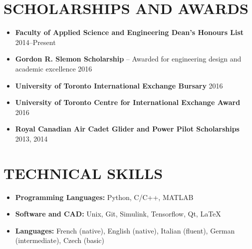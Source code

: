 \documentclass{ResumeTemplate}
\begin{document}
	\section{SCHOLARSHIPS AND AWARDS}	
	\begin{itemize}[noitemsep, leftmargin=*]
		\item \textbf{Faculty of Applied Science and Engineering Dean's Honours List} \hfill 2014--Present
		\item \textbf{Gordon R. Slemon Scholarship} -- Awarded for engineering design and academic excellence \hfill 2016
		\item \textbf{University of Toronto International Exchange Bursary} \hfill 2016
		\item \textbf{University of Toronto Centre for International Exchange Award} \hfill 2016
		\item \textbf{Royal Canadian Air Cadet Glider and Power Pilot Scholarships} \hfill 2013, 2014\vspace*{-\baselineskip}
	\end{itemize}
	
	\section{TECHNICAL SKILLS}
	\raggedright
	\begin{itemize}[noitemsep, leftmargin=*]
		\item \textbf{Programming Languages:} Python, C/C++,  MATLAB \\
		\item \textbf{Software and CAD:} Unix, Git, Simulink, Tensorflow, Qt, LaTeX\\
		\item \textbf{Languages:} French (native),  English (native),  Italian (fluent),  German (intermediate), Czech (basic)\vspace*{-\baselineskip}
	\end{itemize}
\end{document}
